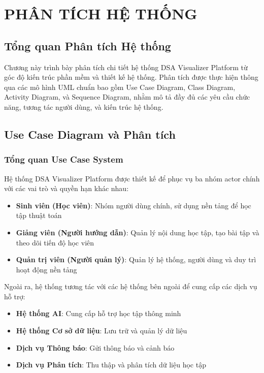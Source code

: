\chapter{PHÂN TÍCH HỆ THỐNG}
\label{ch:system-analysis}

\section{Tổng quan Phân tích Hệ thống}
\label{sec:system-analysis-overview}

Chương này trình bày phân tích chi tiết hệ thống DSA Visualizer Platform từ góc độ kiến trúc phần mềm và thiết kế hệ thống. Phân tích được thực hiện thông qua các mô hình UML chuẩn bao gồm Use Case Diagram, Class Diagram, Activity Diagram, và Sequence Diagram, nhằm mô tả đầy đủ các yêu cầu chức năng, tương tác người dùng, và kiến trúc hệ thống.

\section{Use Case Diagram và Phân tích}
\label{sec:use-case-diagram}

\subsection{Tổng quan Use Case System}
\label{subsec:use-case-system-overview}

Hệ thống DSA Visualizer Platform được thiết kế để phục vụ ba nhóm actor chính với các vai trò và quyền hạn khác nhau:

\begin{itemize}
    \item \textbf{Sinh viên (Học viên)}: Nhóm người dùng chính, sử dụng nền tảng để học tập thuật toán
    \item \textbf{Giảng viên (Người hướng dẫn)}: Quản lý nội dung học tập, tạo bài tập và theo dõi tiến độ học viên
    \item \textbf{Quản trị viên (Người quản lý)}: Quản lý hệ thống, người dùng và duy trì hoạt động nền tảng
\end{itemize}

Ngoài ra, hệ thống tương tác với các hệ thống bên ngoài để cung cấp các dịch vụ hỗ trợ:

\begin{itemize}
    \item \textbf{Hệ thống AI}: Cung cấp hỗ trợ học tập thông minh
    \item \textbf{Hệ thống Cơ sở dữ liệu}: Lưu trữ và quản lý dữ liệu
    \item \textbf{Dịch vụ Thông báo}: Gửi thông báo và cảnh báo
    \item \textbf{Dịch vụ Phân tích}: Thu thập và phân tích dữ liệu học tập
\end{itemize}

